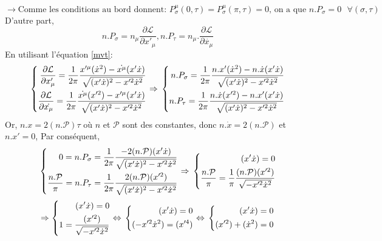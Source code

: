 \documentclass[a4paper,12pt]{article}
\def\xmu{x^\mu}
\def\CL{\mathcal{L}}
\begin{document}
\begin{equation*}
\rightarrow\mbox{Comme les conditions au bord donnent: }  P_\sigma^\mu(0,\tau)=P_\sigma^\mu(\pi,\tau)=0\mbox{, on a que } n.P_\sigma=0 \mbox{ }\forall (\sigma,\tau)
\end{equation*}
D'autre part, 
$$n.P_\sigma=n_\mu \frac{\partial \CL}{\partial x'_\mu }, n.P_\tau=n_\mu.\frac{\partial \CL}{\partial \dot{x_\mu}}$$
En utilisant l'équation \eqref{mvt}:
\begin{equation*}
	\left\lbrace
	\begin{aligned}
	\frac{\partial \CL}{\partial x'_\mu }=\frac{1}{2\pi}\frac{x'^\mu (\dot{x}^2)-\dot{\xmu}(x'\dot{x})}{\sqrt{(x'\dot{x})^2-x'^2\dot{x}^2}}\\
	\frac{\partial \CL}{\partial \dot{x_\mu}}=\frac{1}{2\pi}\frac{\dot{\xmu} (x'^2)-x'^\mu(x'\dot{x})}{\sqrt{(x'\dot{x})^2-x'^2\dot{x}^2}}\\
	\end{aligned}
	\right.
	\Rightarrow\\
	\left\lbrace
	\begin{aligned}
	n.P_\sigma=\frac{1}{2\pi}\frac{n.x' (\dot{x}^2)-n.\dot{x}(x'\dot{x})}{\sqrt{(x'\dot{x})^2-x'^2\dot{x}^2}}\\
	n.P_\tau=\frac{1}{2\pi}\frac{n.\dot{x} (x'^2)-n.x'(x'\dot{x})}{\sqrt{(x'\dot{x})^2-x'^2\dot{x}^2}}
	\end{aligned}
	\right.
\end{equation*}
Or, $n.x=2(n.\mathcal{P})\tau$ où $n$ et $\mathcal{P}$ sont des constantes,
donc $n.\dot{x}=2(n.\mathcal{P})$ et $n.x'=0$,
Par conséquent, 
\begin{equation*}
	\left\lbrace
	\begin{aligned}
	0=n.P_\sigma=\frac{1}{2\pi}\frac{-2(n.\mathcal{P})(x'\dot{x})}{\sqrt{(x'\dot{x})^2-x'^2\dot{x}^2}}\\
	\frac{n.\mathcal{P}}{\pi}=n.P_\tau=\frac{1}{2\pi}\frac{2(n.\mathcal{P}) (x'^2)}{\sqrt{(x'\dot{x})^2-x'^2\dot{x}^2}}
	\end{aligned}
	\right.
	\Rightarrow\\
	\left\lbrace
	\begin{aligned}
	(x'\dot{x})=0\\
	\frac{n.\mathcal{P}}{\pi}=\frac{1}{\pi}\frac{(n.\mathcal{P}) (x'^2)}{\sqrt{-x'^2\dot{x}^2}}
	\end{aligned}
	\right.	
\end{equation*}
\begin{equation*}
	\Rightarrow\left\lbrace
	\begin{aligned}
	(x'\dot{x})=0\\
	1=\frac{ (x'^2)}{\sqrt{-x'^2\dot{x}^2}}
	\end{aligned}
	\right.
	\Leftrightarrow\\
	\left\lbrace
	\begin{aligned}
	(x'\dot{x})=0\\
	(-x'^2\dot{x}^2)=(x'^4)
	\end{aligned}
	\right.	
	\Leftrightarrow\\
	\left\lbrace
	\begin{aligned}
	(x'\dot{x})=0\\
	(x'^2)+(\dot{x}^2)=0
	\end{aligned}
	\right.	
\end{equation*}
\end{document}
